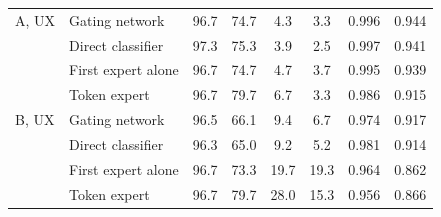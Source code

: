 \begin{table}[t]
\begin{tabular}{ll|cc|cc|cc}
\midrule
A, UX & Gating network & 96.7 & 74.7 & 4.3 & 3.3 & 0.996 & 0.944 \\
 & Direct classifier & 97.3 & 75.3 & 3.9 & 2.5 & 0.997 & 0.941 \\
 & First expert alone & 96.7 & 74.7 & 4.7 & 3.7 & 0.995 & 0.939 \\
 & Token expert & 96.7 & 79.7 & 6.7 & 3.3 & 0.986 & 0.915 \\
\midrule
B, UX & Gating network & 96.5 & 66.1 & 9.4 & 6.7 & 0.974 & 0.917 \\
 & Direct classifier & 96.3 & 65.0 & 9.2 & 5.2 & 0.981 & 0.914 \\
 & First expert alone & 96.7 & 73.3 & 19.7 & 19.3 & 0.964 & 0.862 \\
 & Token expert & 96.7 & 79.7 & 28.0 & 15.3 & 0.956 & 0.866 \\

\bottomrule
\end{tabular}
\end{table}
